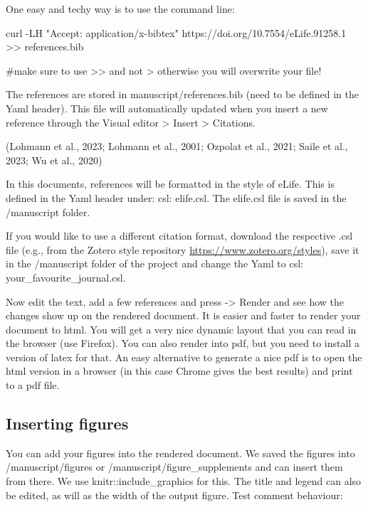 \documentclass[
  11pt,
]{article}
\newenvironment{Shaded}{\begin{snugshade}}{\end{snugshade}}
\newcommand{\AttributeTok}[1]{\textcolor[rgb]{0.40,0.45,0.13}{#1}}
\newcommand{\CommentTok}[1]{\textcolor[rgb]{0.37,0.37,0.37}{#1}}
\newcommand{\ExtensionTok}[1]{\textcolor[rgb]{0.00,0.23,0.31}{#1}}
\newcommand{\NormalTok}[1]{\textcolor[rgb]{0.00,0.23,0.31}{#1}}
\newcommand{\OperatorTok}[1]{\textcolor[rgb]{0.37,0.37,0.37}{#1}}
\newcommand{\StringTok}[1]{\textcolor[rgb]{0.13,0.47,0.30}{#1}}
\begin{document}
One easy and techy way is to use the command line:

\begin{Shaded}
\begin{Highlighting}[]
\ExtensionTok{curl} \AttributeTok{{-}LH} \StringTok{"Accept: application/x{-}bibtex"}\NormalTok{ https://doi.org/10.7554/eLife.91258.1 }\OperatorTok{\textgreater{}\textgreater{}}\NormalTok{ references.bib}

\CommentTok{\#make sure to use \textgreater{}\textgreater{} and not \textgreater{} otherwise you will overwrite your file!}
\end{Highlighting}
\end{Shaded}

The references are stored in manuscript/references.bib (need to be
defined in the Yaml header). This file will automatically updated when
you insert a new reference through the Visual editor \textgreater{}
Insert \textgreater{} Citations.

(Lohmann et al., 2023; Lohmann et al., 2001; Ozpolat et al., 2021; Saile
et al., 2023; Wu et al., 2020)

In this documents, references will be formatted in the style of eLife.
This is defined in the Yaml header under: csl: elife.csl. The elife.csl
file is saved in the /manuscript folder.

If you would like to use a different citation format, download the
respective .csl file (e.g., from the Zotero style repository
\url{https://www.zotero.org/styles}), save it in the /manuscript folder
of the project and change the Yaml to csl: your\_favourite\_journal.csl.

Now edit the text, add a few references and press -\textgreater{} Render
and see how the changes show up on the rendered document. It is easier
and faster to render your document to html. You will get a very nice
dynamic layout that you can read in the browser (use Firefox). You can
also render into pdf, but you need to install a version of latex for
that. An easy alternative to generate a nice pdf is to open the html
version in a browser (in this case Chrome gives the best results) and
print to a pdf file.

\subsection{Inserting figures}\label{inserting-figures}

You can add your figures into the rendered document. We saved the
figures into /manuscript/figures or /manuscript/figure\_supplements and
can insert them from there. We use knitr::include\_graphics for this.
The title and legend can also be edited, as will as the width of the
output figure. Test comment behaviour:
\end{document}
